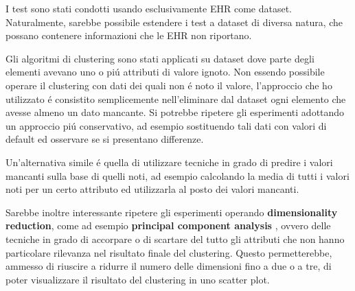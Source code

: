 \documentclass[12pt]{report}
\begin{document}
		I test sono stati condotti usando esclusivamente EHR come dataset.
		Naturalmente, sarebbe possibile estendere i test a dataset di diversa
		natura, che possano contenere informazioni che le EHR non riportano.

		Gli algoritmi di clustering sono stati applicati su dataset dove
		parte degli elementi avevano uno o piú attributi di valore ignoto.
		Non essendo possibile operare il clustering con dati dei quali non
		é noto il valore, l'approccio che ho utilizzato é consistito
		semplicemente nell'eliminare dal dataset ogni elemento che avesse
		almeno un dato mancante. Si potrebbe ripetere gli esperimenti
		adottando un approccio piú conservativo, ad esempio sostituendo
		tali dati con valori di default ed osservare se si presentano
		differenze.

		Un'alternativa simile é quella di utilizzare tecniche in grado di
		predire i valori mancanti sulla base di quelli noti, ad esempio
		calcolando la media di tutti i valori noti per un certo attributo
		ed utilizzarla al posto dei valori mancanti.

		Sarebbe inoltre interessante ripetere gli esperimenti
		operando \textbf{dimensionality reduction}, come ad esempio
		\textbf{principal component analysis} \cite{Hotelling1933AnalysisOA},
		ovvero delle tecniche in grado di accorpare o di scartare del tutto
		gli attributi che non hanno particolare rilevanza nel risultato
		finale del clustering. Questo permetterebbe, ammesso di riuscire
		a ridurre il numero delle dimensioni fino a due o a tre, di poter
		visualizzare il risultato del clustering in uno scatter plot.

	\printbibliography
\end{document}
